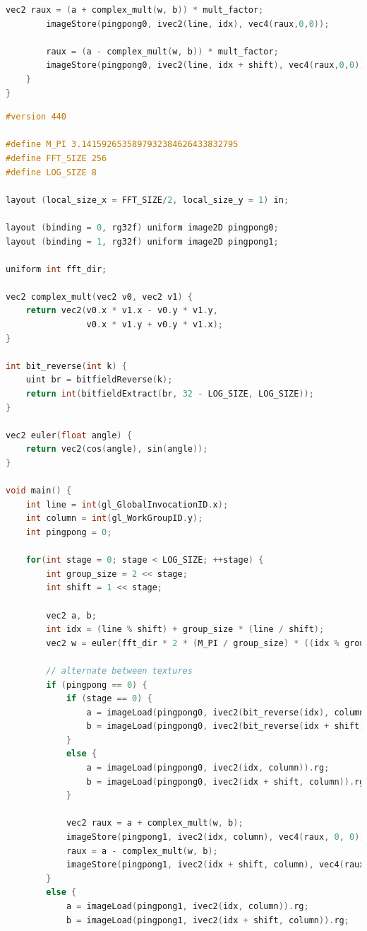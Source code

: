 \documentclass[
  oneside,
  11pt, a4paper,
  footinclude=true,
  headinclude=true,
  cleardoublepage=empty
]{scrbook}
\begin{document}
\begin{lstlisting}[language=C,caption={FFT Radix-2 Cooley-Tukey Vertical stage pass, see \autoref{sec:ct-impl}},label={lst:glsl-radix2-ct-stage-vertical}]
        vec2 raux = (a + complex_mult(w, b)) * mult_factor;
        imageStore(pingpong0, ivec2(line, idx), vec4(raux,0,0));
            
        raux = (a - complex_mult(w, b)) * mult_factor;
        imageStore(pingpong0, ivec2(line, idx + shift), vec4(raux,0,0));
    }
}
\end{lstlisting}

\begin{lstlisting}[language=C,caption={FFT Radix-2 Cooley-Tukey Horizontal unique pass, see \autoref{subsec:all-stages-in-one-pass}},label={lst:glsl-radix2-ct-unique-horizontal}]
#version 440

#define M_PI 3.1415926535897932384626433832795
#define FFT_SIZE 256
#define LOG_SIZE 8

layout (local_size_x = FFT_SIZE/2, local_size_y = 1) in;

layout (binding = 0, rg32f) uniform image2D pingpong0;
layout (binding = 1, rg32f) uniform image2D pingpong1;

uniform int fft_dir;

vec2 complex_mult(vec2 v0, vec2 v1) {
    return vec2(v0.x * v1.x - v0.y * v1.y,
                v0.x * v1.y + v0.y * v1.x);
}

int bit_reverse(int k) {
    uint br = bitfieldReverse(k);
    return int(bitfieldExtract(br, 32 - LOG_SIZE, LOG_SIZE));
}

vec2 euler(float angle) {
    return vec2(cos(angle), sin(angle));
}

void main() {
    int line = int(gl_GlobalInvocationID.x);
    int column = int(gl_WorkGroupID.y);
    int pingpong = 0;
    
    for(int stage = 0; stage < LOG_SIZE; ++stage) {
        int group_size = 2 << stage;
        int shift = 1 << stage;

        vec2 a, b;
        int idx = (line % shift) + group_size * (line / shift);
        vec2 w = euler(fft_dir * 2 * (M_PI / group_size) * ((idx % group_size) % shift));

        // alternate between textures
        if (pingpong == 0) {
            if (stage == 0) {
                a = imageLoad(pingpong0, ivec2(bit_reverse(idx), column)).rg;
                b = imageLoad(pingpong0, ivec2(bit_reverse(idx + shift), column)).rg;
            }
            else {
                a = imageLoad(pingpong0, ivec2(idx, column)).rg;
                b = imageLoad(pingpong0, ivec2(idx + shift, column)).rg;
            }

            vec2 raux = a + complex_mult(w, b);
            imageStore(pingpong1, ivec2(idx, column), vec4(raux, 0, 0));
            raux = a - complex_mult(w, b);
            imageStore(pingpong1, ivec2(idx + shift, column), vec4(raux, 0, 0));
        }
        else {
            a = imageLoad(pingpong1, ivec2(idx, column)).rg;
            b = imageLoad(pingpong1, ivec2(idx + shift, column)).rg;


\end{lstlisting}
\end{document}
